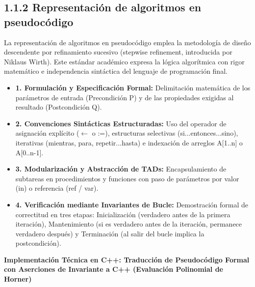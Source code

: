 \documentclass[11pt,letterpaper]{article}
\begin{document}
\subsection*{1.1.2 Representación de algoritmos en pseudocódigo}
La representación de algoritmos en pseudocódigo emplea la metodología de diseño descendente por refinamiento sucesivo (stepwise refinement, introducida por Niklaus Wirth). Este estándar académico expresa la lógica algorítmica con rigor matemático e independencia sintáctica del lenguaje de programación final.\par
\begin{itemize}
\setlength{\itemsep}{2pt}\setlength{\parskip}{0pt}
  \item \textbf{1. Formulación y Especificación Formal: }Delimitación matemática de los parámetros de entrada (Precondición P) y de las propiedades exigidas al resultado (Postcondición Q).
  \item \textbf{2. Convenciones Sintácticas Estructuradas: }Uso del operador de asignación explícito ($\leftarrow$ o :=), estructuras selectivas (si...entonces...sino), iterativas (mientras, para, repetir...hasta) e indexación de arreglos A[1..n] o A[0..n-1].
  \item \textbf{3. Modularización y Abstracción de TADs: }Encapsulamiento de subtareas en procedimientos y funciones con paso de parámetros por valor (in) o referencia (ref / var).
  \item \textbf{4. Verificación mediante Invariantes de Bucle: }Demostración formal de correctitud en tres etapas: Inicialización (verdadero antes de la primera iteración), Mantenimiento (si es verdadero antes de la iteración, permanece verdadero después) y Terminación (al salir del bucle implica la postcondición).
\end{itemize}
\vspace{4pt}\noindent\textbf{\color{ipnblue}Implementación Técnica en C++: Traducción de Pseudocódigo Formal con Aserciones de Invariante a C++ (Evaluación Polinomial de Horner)}\par\vspace{-2pt}
\end{document}
